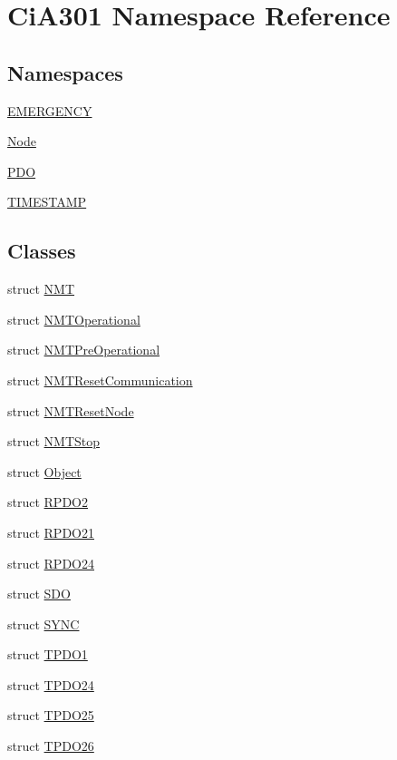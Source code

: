 \hypertarget{namespace_ci_a301}{}\section{Ci\+A301 Namespace Reference}
\label{namespace_ci_a301}
\subsection*{Namespaces}
\begin{DoxyCompactItemize}
\item 
 \hyperlink{namespace_ci_a301_1_1_e_m_e_r_g_e_n_c_y}{E\+M\+E\+R\+G\+E\+N\+C\+Y}
\item 
 \hyperlink{namespace_ci_a301_1_1_node}{Node}
\item 
 \hyperlink{namespace_ci_a301_1_1_p_d_o}{P\+D\+O}
\item 
 \hyperlink{namespace_ci_a301_1_1_t_i_m_e_s_t_a_m_p}{T\+I\+M\+E\+S\+T\+A\+M\+P}
\end{DoxyCompactItemize}
\subsection*{Classes}
\begin{DoxyCompactItemize}
\item 
struct \hyperlink{struct_ci_a301_1_1_n_m_t}{N\+M\+T}
\item 
struct \hyperlink{struct_ci_a301_1_1_n_m_t_operational}{N\+M\+T\+Operational}
\item 
struct \hyperlink{struct_ci_a301_1_1_n_m_t_pre_operational}{N\+M\+T\+Pre\+Operational}
\item 
struct \hyperlink{struct_ci_a301_1_1_n_m_t_reset_communication}{N\+M\+T\+Reset\+Communication}
\item 
struct \hyperlink{struct_ci_a301_1_1_n_m_t_reset_node}{N\+M\+T\+Reset\+Node}
\item 
struct \hyperlink{struct_ci_a301_1_1_n_m_t_stop}{N\+M\+T\+Stop}
\item 
struct \hyperlink{struct_ci_a301_1_1_object}{Object}
\item 
struct \hyperlink{struct_ci_a301_1_1_r_p_d_o2}{R\+P\+D\+O2}
\item 
struct \hyperlink{struct_ci_a301_1_1_r_p_d_o21}{R\+P\+D\+O21}
\item 
struct \hyperlink{struct_ci_a301_1_1_r_p_d_o24}{R\+P\+D\+O24}
\item 
struct \hyperlink{struct_ci_a301_1_1_s_d_o}{S\+D\+O}
\item 
struct \hyperlink{struct_ci_a301_1_1_s_y_n_c}{S\+Y\+N\+C}
\item 
struct \hyperlink{struct_ci_a301_1_1_t_p_d_o1}{T\+P\+D\+O1}
\item 
struct \hyperlink{struct_ci_a301_1_1_t_p_d_o24}{T\+P\+D\+O24}
\item 
struct \hyperlink{struct_ci_a301_1_1_t_p_d_o25}{T\+P\+D\+O25}
\item 
struct \hyperlink{struct_ci_a301_1_1_t_p_d_o26}{T\+P\+D\+O26}
\end{DoxyCompactItemize}
